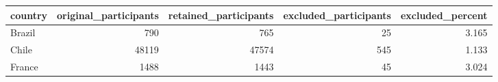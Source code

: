 \begin{tabular}{lrrrr}
\toprule
country & original_participants & retained_participants & excluded_participants & excluded_percent \\
\midrule
Brazil & 790 & 765 & 25 & 3.165 \\
Chile & 48119 & 47574 & 545 & 1.133 \\
France & 1488 & 1443 & 45 & 3.024 \\
\bottomrule
\end{tabular}
